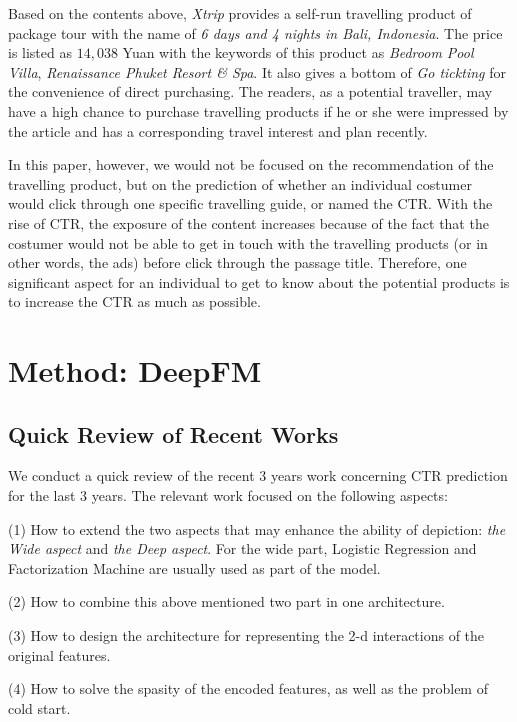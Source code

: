 \documentclass{article}
\begin{document}
	Based on the contents above, \emph{Xtrip} provides a self-run travelling product of package tour with the name of \emph{6 days and 4 nights in Bali, Indonesia}. The price is listed as $14,038$ Yuan with the keywords of this product as \emph{Bedroom Pool Villa}, \emph{Renaissance Phuket Resort \& Spa}. It also gives a bottom of \emph{Go tickting} for the convenience of direct purchasing. The readers, as a potential traveller, may have a high chance to purchase travelling products if he or she were impressed by the article and has a corresponding travel interest and plan recently. 

	In this paper, however, we would not be focused on the recommendation of the travelling product, but on the prediction of whether an individual costumer would click through one specific travelling guide, or named the CTR. With the rise of CTR, the exposure of the content increases because of the fact that the costumer would not be able to get in touch with the travelling products (or in other words, the ads) before click through the passage title. Therefore, one significant aspect for an individual to get to know about the potential products is to increase the CTR as much as possible.  

    \newpage
    \section{Method: DeepFM}
	\label{sec:method}
    
    \subsection{Quick Review of Recent Works}
    We conduct a quick review of the recent 3 years work concerning CTR prediction for the last 3 years. The relevant work focused on the following aspects:

    (1) How to extend the two aspects that may enhance the ability of depiction: \emph{the Wide aspect} and \emph{the Deep aspect}. For the wide part, Logistic Regression and Factorization Machine are usually used as part of the model.
 
    (2) How to combine this above mentioned two part in one architecture.

    (3) How to design the architecture for representing the 2-d interactions of the original features.

    (4) How to solve the spasity of the encoded features, as well as the problem of cold start. 
\end{document}
